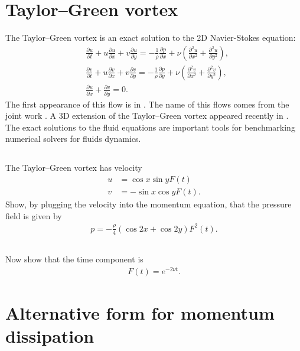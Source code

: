 \documentclass[11pt,letterpaper]{article}
\begin{document}
\section{Taylor–Green vortex}
The Taylor–Green vortex is an exact solution to the 2D Navier-Stokes equation:
\begin{align}
    &\frac{\partial u}{\partial t} + u\frac{\partial u}{\partial x} + v\frac{\partial u}{\partial y} = -\frac{1}{\rho} \frac{\partial p}{\partial x} + \nu \left( \frac{\partial^2 u}{\partial x^2} + \frac{\partial^2 u}{\partial y^2} \right),\\
    &\frac{\partial v}{\partial t} + u\frac{\partial v}{\partial x} + v\frac{\partial v}{\partial y} = -\frac{1}{\rho} \frac{\partial p}{\partial y} + \nu \left( \frac{\partial^2 v}{\partial x^2} + \frac{\partial^2 v}{\partial y^2} \right),\\
    &\frac{\partial u}{\partial x}+ \frac{\partial v}{\partial y} = 0.
\end{align}
The first appearance of this flow is in \cite{Taylor_23}. The name of this flows comes from the joint work \cite{TaylorGreen_37}. A 3D extension of the Taylor–Green vortex appeared recently in \cite{Antuono_20}. The exact solutions to the fluid equations are important tools for benchmarking numerical solvers for fluids dynamics. 

\subsection{}
The Taylor–Green vortex has velocity
\begin{align}
    u &= \cos x\sin y F(t)\\
    v &= -\sin x\cos y F(t).
\end{align}
Show, by plugging the velocity into the momentum equation, that the pressure field is given by
\begin{align}
    p = -\frac{\rho}{4}(\cos 2x+\cos 2y)F^2(t).
\end{align}

\subsection{}
Now show that the time component is
\begin{align}
    F(t) = e^{-2\nu t}.
\end{align}

\section{Alternative form for momentum dissipation}
\end{document}
